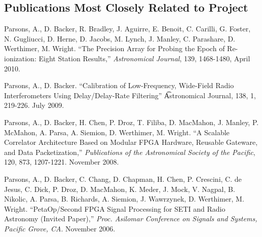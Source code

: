\documentclass[apjpt4]{aastex}
\begin{document}
\subsection*{Publications Most Closely Related to Project}
\vspace{-8pt}

%

Parsons, A.,  D. Backer, R. Bradley, J. Aguirre, E. Benoit, C. Carilli, G. Foster, N. Gugliucci, D. Herne, D. Jacobs, M. Lynch, J. Manley, C. Parashare, D. Werthimer, M. Wright.
``The Precision Array for Probing the Epoch of Re-ionization: Eight Station Results,''
{\it Astronomical Journal}, 139, 1468-1480, April 2010.

Parsons, A., D. Backer.
``Calibration of Low-Frequency, Wide-Field Radio Interferometers Using Delay/Delay-Rate Filtering''
{\t Astronomical Journal}, 138, 1, 219-226. July 2009.

Parsons, A., D. Backer, H. Chen, P. Droz, T. Filiba, D. MacMahon, J. Manley,
P. McMahon, A. Parsa, A. Siemion, D. Werthimer, M. Wright.
``A Scalable Correlator Architecture Based on Modular FPGA Hardware,
Reusable Gateware, and Data Packetization,''
{\it Publications of the Astronomical Society of the Pacific}, 120, 873, 1207-1221. November 2008.

Parsons, A., D. Backer, C. Chang, D. Chapman, H. Chen, P. Crescini, C. de Jesus,
C. Dick, P. Droz, D. MacMahon, K. Meder, J. Mock, V. Nagpal, B. Nikolic, 
A. Parsa, B. Richards, A. Siemion, J. Wawrzynek, D. Werthimer, M. Wright.
``PetaOp/Second FPGA Signal Processing for SETI and Radio Astronomy (Invited 
Paper),'' 
{\it Proc. Asilomar Conference on Signals and Systems, Pacific Grove, CA}. 
November 2006.
\end{document}
